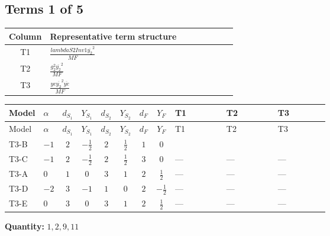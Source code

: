 \documentclass[8pt]{article}
\begin{document}
\begin{landscape}
\subsection*{Terms 1 of 5}
\begin{center}
\begin{tabular}{@{}c >{\raggedright\arraybackslash}p{0.82\linewidth}@{}}
\toprule
Column & Representative term structure \\
\midrule
T1 & \(\displaystyle \frac{lambdaS2Inv1 \overline{y_{2}}^{2}}{MF}\) \\
\midrule
T2 & \(\displaystyle \frac{g_{2}^{2} \overline{y_{2}}^{2}}{MF}\) \\
\midrule
T3 & \(\displaystyle \frac{ye \overline{y_{2}}^{2} \overline{ye}}{MF}\) \\
\midrule
\bottomrule
\end{tabular}
\end{center}
\smallskip
\tiny
\begin{longtable}{@{}llcccccc >{\raggedright\arraybackslash}p{0.21\linewidth} >{\raggedright\arraybackslash}p{0.21\linewidth} >{\raggedright\arraybackslash}p{0.21\linewidth}@{}}
\toprule
Model & $\alpha$ & $d_{S_1}$ & $Y_{S_1}$ & $d_{S_2}$ & $Y_{S_2}$ & $d_F$ & $Y_F$ & T1 & T2 & T3 \\
\midrule
\endfirsthead
\toprule
Model & $\alpha$ & $d_{S_1}$ & $Y_{S_1}$ & $d_{S_2}$ & $Y_{S_2}$ & $d_F$ & $Y_F$ & T1 & T2 & T3 \\
\midrule
\endhead
T3-B & $-1$ & $2$ & $-\frac{1}{2}$ & $2$ & $\frac{1}{2}$ & $1$ & $0$ & \scriptsize\adjustbox{max width=\linewidth}{$\begin{gathered} \frac{lambdaS2Inv1 \overline{y_{2}}^{2}}{4 MF}\end{gathered}$} & \scriptsize\adjustbox{max width=\linewidth}{$\begin{gathered} \frac{3 g_{2}^{2} \overline{y_{2}}^{2}}{8 MF}\end{gathered}$} & \scriptsize\adjustbox{max width=\linewidth}{$\begin{gathered} - \frac{ye \overline{y_{2}}^{2} \overline{ye}}{8 MF}\end{gathered}$} \\
\midrule
T3-C & $-1$ & $2$ & $-\frac{1}{2}$ & $2$ & $\frac{1}{2}$ & $3$ & $0$ & --- & --- & --- \\
\midrule
T3-A & $0$ & $1$ & $0$ & $3$ & $1$ & $2$ & $\frac{1}{2}$ & --- & --- & --- \\
\midrule
T3-D & $-2$ & $3$ & $-1$ & $1$ & $0$ & $2$ & $-\frac{1}{2}$ & --- & --- & --- \\
\midrule
T3-E & $0$ & $3$ & $0$ & $3$ & $1$ & $2$ & $\frac{1}{2}$ & --- & --- & --- \\
\midrule
\bottomrule
\end{longtable}
\clearpage
\noindent\textbf{Quantity: }$\mathrm{1,2,9,11}$\par\smallskip

\end{landscape}
\end{document}

